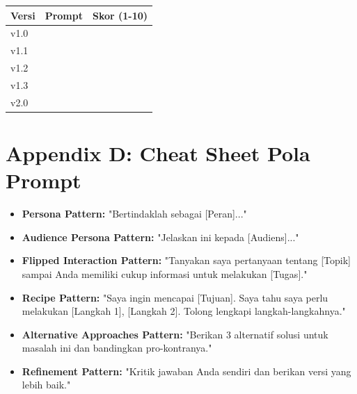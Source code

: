 \vspace{1cm}

\begin{center}
\begin{tabular}{|p{3cm}|p{8cm}|p{3cm}|}
\hline
\textbf{Versi} & \textbf{Prompt} & \textbf{Skor (1-10)} \\
\hline
v1.0 & & \\[2cm]
\hline
v1.1 & & \\[2cm]
\hline
v1.2 & & \\[2cm]
\hline
v1.3 & & \\[2cm]
\hline
v2.0 & & \\[2cm]
\hline
\end{tabular}
\end{center}

\chapter{Appendix D: Cheat Sheet Pola Prompt}
\label{chap:appendix_d}

\begin{itemize}
    \item \textbf{Persona Pattern:} "Bertindaklah sebagai [Peran]..."
    \item \textbf{Audience Persona Pattern:} "Jelaskan ini kepada [Audiens]..."
    \item \textbf{Flipped Interaction Pattern:} "Tanyakan saya pertanyaan tentang [Topik] sampai Anda memiliki cukup informasi untuk melakukan [Tugas]."
    \item \textbf{Recipe Pattern:} "Saya ingin mencapai [Tujuan]. Saya tahu saya perlu melakukan [Langkah 1], [Langkah 2]. Tolong lengkapi langkah-langkahnya."
    \item \textbf{Alternative Approaches Pattern:} "Berikan 3 alternatif solusi untuk masalah ini dan bandingkan pro-kontranya."
    \item \textbf{Refinement Pattern:} "Kritik jawaban Anda sendiri dan berikan versi yang lebih baik."
\end{itemize}

\endinput
